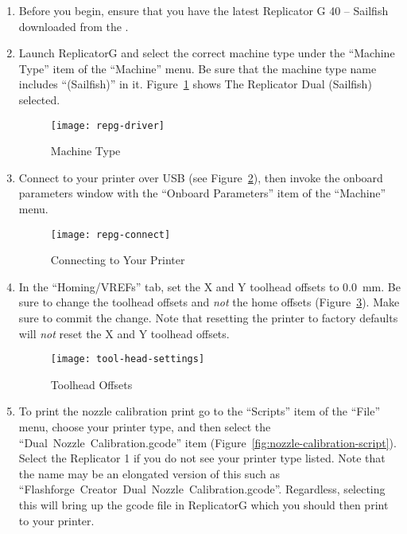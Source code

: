 \begin{enumerate}
\item Before you begin, ensure that you have the latest Replicator G 40 -- Sailfish downloaded from the .
\item Launch ReplicatorG and select the correct machine type under the ``Machine Type'' item of the ``Machine'' menu.  Be sure that the machine type name includes ``(Sailfish)'' in it.  Figure~\ref{fig:repg-driver-2} shows The Replicator Dual (Sailfish) selected.

\begin{figure}[!htbp]
  \centering
    \texttt{[image: repg-driver]}
    \caption{Machine Type}
  \label{fig:repg-driver-2}
\end{figure}

\item Connect to your printer over USB (see Figure~\ref{fig:repgconnect}), then invoke the \Gls{onboard parameters} window with the ``Onboard Parameters'' item of the ``Machine'' menu.

\begin{figure}[!htbp]
  \centering
    \texttt{[image: repg-connect]}
    \caption{Connecting to Your Printer}
  \label{fig:repgconnect}
\end{figure}

\item In the ``Homing/VREFs'' tab, set the X and Y toolhead offsets to 0.0~mm.  Be sure to change the toolhead offsets and \emph{not} the home offsets (Figure~\ref{fig:tool-head-settings}).  Make sure to commit the change.  Note that resetting the printer to factory defaults will \emph{not} reset the X and Y toolhead offsets.

\begin{figure}[!htbp]
  \centering
    \texttt{[image: tool-head-settings]}
    \caption{Toolhead Offsets}
  \label{fig:tool-head-settings}
\end{figure}

\item To print the nozzle calibration print go to the ``Scripts'' item of the ``File'' menu, choose your printer type, and then select the ``Dual~Nozzle~Calibration.gcode'' item (Figure~\ref{fig:nozzle-calibration-script}).  Select the Replicator 1 if you do not see your printer type listed.  Note that the name may be an elongated version of this such as ``Flashforge~Creator~Dual~Nozzle~Calibration.gcode''.  Regardless, selecting this will bring up the \gls{gcode} file in ReplicatorG which you should then print to your printer.


\end{enumerate}
